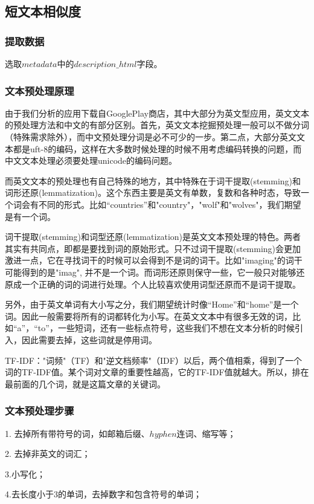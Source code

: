 \documentclass[UTF8,a4paper,10pt, twocolumn]{ctexart}
\begin{document}
\subsection{短文本相似度}
\subsubsection{提取数据}
选取$metadata$中的$description\_html$字段。

\subsubsection{文本预处理原理}
由于我们分析的应用下载自GooglePlay商店，其中大部分为英文型应用，英文文本的预处理方法和中文的有部分区别。首先，英文文本挖掘预处理一般可以不做分词（特殊需求除外），而中文预处理分词是必不可少的一步。第二点，大部分英文文本都是uft-8的编码，这样在大多数时候处理的时候不用考虑编码转换的问题，而中文文本处理必须要处理unicode的编码问题。

而英文文本的预处理也有自己特殊的地方，其中特殊在于词干提取(stemming)和词形还原(lemmatization)。这个东西主要是英文有单数，复数和各种时态，导致一个词会有不同的形式。比如“countries”和"country"，"wolf"和"wolves"，我们期望是有一个词。

词干提取(stemming)和词型还原(lemmatization)是英文文本预处理的特色。两者其实有共同点，即都是要找到词的原始形式。只不过词干提取(stemming)会更加激进一点，它在寻找词干的时候可以会得到不是词的词干。比如"imaging"的词干可能得到的是"imag", 并不是一个词。而词形还原则保守一些，它一般只对能够还原成一个正确的词的词进行处理。个人比较喜欢使用词型还原而不是词干提取。

另外，由于英文单词有大小写之分，我们期望统计时像“Home”和“home”是一个词。因此一般需要将所有的词都转化为小写。在英文文本中有很多无效的词，比如“a”，“to”，一些短词，还有一些标点符号，这些我们不想在文本分析的时候引入，因此需要去掉，这些词就是停用词。

TF-IDF："词频"（TF）和"逆文档频率"（IDF）以后，两个值相乘，得到了一个词的TF-IDF值。某个词对文章的重要性越高，它的TF-IDF值就越大。所以，排在最前面的几个词，就是这篇文章的关键词。

\subsubsection{文本预处理步骤}
1. 去掉所有带符号的词，如邮箱后缀、$hyphen$连词、缩写等；

2. 去掉非英文的词汇；

3.小写化；

4.去长度小于3的单词，去掉数字和包含符号的单词；
\end{document}
